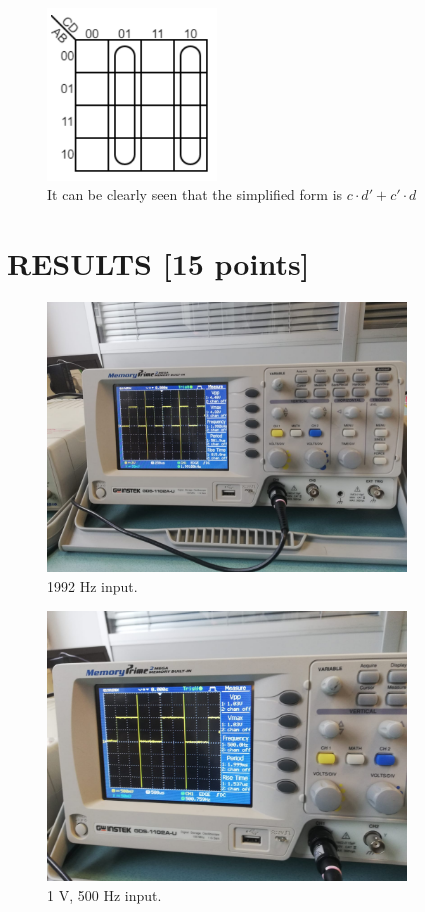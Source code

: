 \documentclass[pdftex,12pt,a4paper]{article}
\begin{document}
\begin{figure}[H]
	\centering
	\includegraphics[width=0.4\textwidth]{f4_kmap.png}	
	\caption{It can be clearly seen that the simplified form is \(c \cdot d' + c' \cdot d\)}
	\label{fig8}
\end{figure}

\section{RESULTS [15 points]}
\begin{figure}[H]
	\centering
	\includegraphics[width=0.85\textwidth]{osc1.jpg}	
	\caption{1992 Hz input.}
	\label{fig9}
\end{figure}

\begin{figure}[H]
	\centering
	\includegraphics[width=0.85\textwidth]{osc2.jpg}	
	\caption{1 V, 500 Hz input.}
	\label{fig10}
\end{figure}
\end{document}
